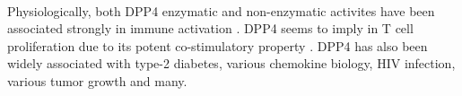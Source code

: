 \\
Physiologically, both DPP4 enzymatic and non-enzymatic activites have been associated strongly in immune activation \cite{Abbott:2000qr}. DPP4 seems to imply in T cell proliferation due to its potent co-stimulatory property \cite{Mentlein_1999}. DPP4 has also been widely associated with type-2 diabetes, various chemokine biology, HIV infection, various tumor growth and many. 
\\
